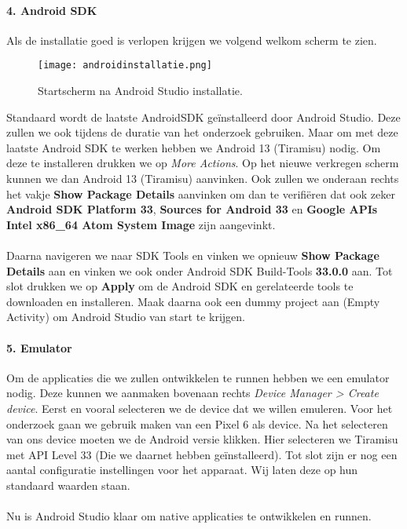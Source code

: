 \paragraph{4. Android SDK}\label{par:sdk}
Als de installatie goed is verlopen krijgen we volgend welkom scherm te zien. 
\begin{figure}[H]
    \centering
    \texttt{[image: androidinstallatie.png]}
    \caption{Startscherm na Android Studio installatie.}
\end{figure}
Standaard wordt de laatste \gls{AndroidSDK} geïnstalleerd door Android Studio. 
Deze zullen we ook tijdens de duratie van het onderzoek gebruiken. 
Maar om met deze laatste Android SDK te werken hebben we Android 13 (Tiramisu) nodig. 
Om deze te installeren drukken we op \textit{More Actions}. Op het nieuwe verkregen scherm 
kunnen we dan Android 13 (Tiramisu) aanvinken. Ook zullen we onderaan rechts het vakje 
\textbf{Show Package Details} aanvinken om dan te verifiëren dat ook zeker 
\textbf{Android SDK Platform 33}, \textbf{Sources for Android 33} en 
\textbf{Google APIs Intel x86\_64 Atom System Image} zijn aangevinkt.
\\\\
Daarna navigeren we naar SDK Tools en vinken we opnieuw \textbf{Show Package Details} 
aan en vinken we ook onder Android SDK Build-Tools \textbf{33.0.0} aan. 
Tot slot drukken we op \textbf{Apply} om de Android SDK en gerelateerde tools te downloaden en installeren. 
Maak daarna ook een dummy project aan (Empty Activity) om Android Studio van start te krijgen.

\paragraph{5. Emulator}
Om de applicaties die we zullen ontwikkelen te runnen hebben we een emulator nodig. 
Deze kunnen we aanmaken bovenaan rechts \textit{Device Manager > Create device}. 
Eerst en vooral selecteren we de device dat we willen emuleren. Voor het onderzoek 
gaan we gebruik maken van een Pixel 6 als device. Na het selecteren van ons device moeten we 
de Android versie klikken. Hier selecteren we Tiramisu met API Level 33 (Die we daarnet hebben geïnstalleerd). 
Tot slot zijn er nog een aantal configuratie instellingen voor het apparaat. Wij laten deze op hun standaard 
waarden staan.
\\\\
Nu is Android Studio klaar om native applicaties te ontwikkelen en runnen. 


